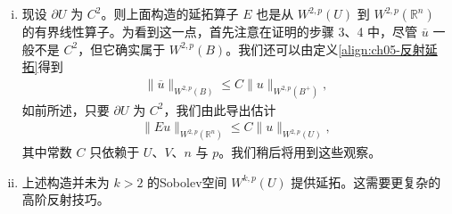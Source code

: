 \documentclass[../../main.tex]{subfiles}
\begin{document}
\begin{remark}\label{remark:ch05-延拓注}
\begin{enumerate}[(i)]
\item 现设 $\partial U$ 为 $C^{2}$。则上面构造的延拓算子 $E$ 也是从 $W^{2,p}(U)$ 到 $W^{2,p}(\mathbb{R}^{n})$ 的有界线性算子。为看到这一点，首先注意在证明的步骤 3、4 中，尽管 $\overline{u}$ 一般不是 $C^{2}$，但它确实属于 $W^{2,p}(B)$。我们还可以由定义\eqref{align:ch05-反射延拓}得到
\begin{align*}
\|\overline{u}\|_{W^{2,p}(B)}\leqslant C\|u\|_{W^{2,p}(B^{+})},
\end{align*}
如前所述，只要 $\partial U$ 为 $C^{2}$，我们由此导出估计
\begin{align}
\|Eu\|_{W^{2,p}(\mathbb{R}^{n})}\leqslant C\|u\|_{W^{2,p}(U)},
\end{align}
其中常数 $C$ 只依赖于 $U$、$V$、$n$ 与 $p$。我们稍后将用到这些观察。
\item 上述构造并未为 $k>2$ 的Sobolev空间 $W^{k,p}(U)$ 提供延拓。这需要更复杂的高阶反射技巧。
\end{enumerate}
\end{remark}
\end{document}

